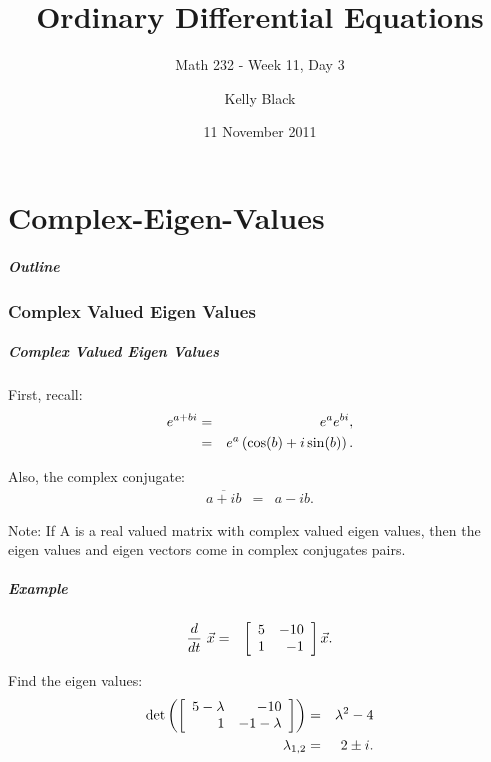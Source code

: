 \part{Complex-Eigen-Values}


\title{Ordinary Differential Equations}
\subtitle{Math 232 - Week 11, Day 3}

\author{Kelly Black}
\date{11 November 2011}

\begin{frame}
  \titlepage
\end{frame}

\begin{frame}
  \frametitle{Outline}
\end{frame}


\section{Complex Valued Eigen Values}


\begin{frame}
  \frametitle{Complex Valued Eigen Values}

  First, recall:
  \begin{eqnarray*}
    e^{a+bi} & = & e^a e^{bi}, \\
    & = & e^a \lp \cos(b) + i \sin(b) \rp.
  \end{eqnarray*}

  Also, the complex conjugate:
  \begin{eqnarray*}
    \overline{a+ib} & = & a-i b.
  \end{eqnarray*}

  Note: If A is a real valued matrix with complex valued eigen values,
  then the eigen values and eigen vectors come in complex conjugates
  pairs.

\end{frame}


\begin{frame}
  \frametitle{Example}

  \begin{eqnarray*}
    \deriv{~}{t} \vec{x} & = & \arrayTwo{5}{-10}{1}{-1} \vec{x}.
  \end{eqnarray*}

  {
    Find the eigen values:
    \begin{eqnarray*}
      \det\lp\arrayTwo{5-\lambda}{-10}{1}{-1-\lambda}\rp & = & \lambda^2-4 \\
      \lambda_{1,2} & = & 2 \pm i.
    \end{eqnarray*}
  }

\end{frame}


